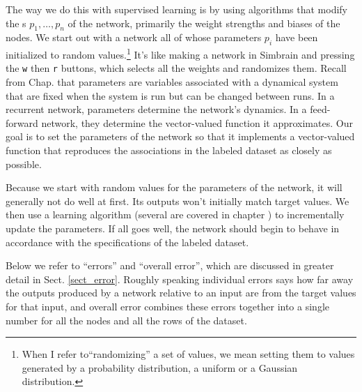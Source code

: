 The way we do this with supervised learning is by using algorithms that modify the s  $p_1,\dots,p_n$ of the network, primarily the weight strengths and biases of the nodes. We start out with a network all of whose parameters $p_i$ have been initialized to random values.\footnote{When I refer to``randomizing'' a set of values, we mean setting them to values generated by a probability distribution, \eg a uniform or a Gaussian distribution.}  It's like making a network in Simbrain and pressing the \texttt{w} then \texttt{r} buttons, which selects all the weights and randomizes them. Recall from Chap.  that parameters are variables associated with a dynamical system that are fixed when the system is run but can be changed between runs. In a recurrent network, parameters determine the network's dynamics. In a feed-forward network, they determine the vector-valued function it approximates. Our goal is to set the parameters of the network so that it implements a vector-valued function that reproduces the associations in the labeled dataset as closely as possible.
 
Because we start with random values for the parameters of the network, it will generally not do well at first. Its outputs won't  initially match target values. We then use a learning algorithm (several are covered in chapter ) to incrementally update the parameters. If all goes well, the network should begin to behave in accordance with the specifications of the labeled dataset.

Below we refer to ``errors''  and ``overall error'', which are discussed in greater detail in Sect. \ref{sect_error}. Roughly speaking individual errors says how far away the outputs produced by a network relative to an input are from the target values for that input, and overall error combines these errors together into a single number for all the nodes and all the rows of the dataset.

